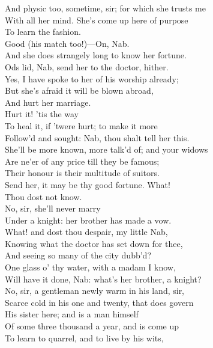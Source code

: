 \documentclass[a4paper,oneside]{memoir}
\begin{document}
\begin{drama*}
\druggerspeaks And physic too, sometime, sir; for which she trusts me\\
With all her mind. She's come up here of purpose\\
To learn the fashion.\\
\facespeaks {} Good (his match too!)---On, Nab.\\
\druggerspeaks And she does strangely long to know her fortune.\\
\facespeaks Ods lid, Nab, send her to the doctor, hither.\\
\druggerspeaks Yes, I have spoke to her of his worship already;\\
But she's afraid it will be blown abroad,\\
And hurt her marriage.\\
\facespeaks {} Hurt it! 'tis the way\\
To heal it, if 'twere hurt; to make it more\\
Follow'd and sought: Nab, thou shalt tell her this.\\
She'll be more known, more talk'd of; and your widows\\
Are ne'er of any price till they be famous;\\
Their honour is their multitude of suitors.\\
Send her, it may be thy good fortune. What!\\
Thou dost not know.\\
\druggerspeaks {} No, sir, she'll never marry\\
Under a knight: her brother has made a vow.\\
\facespeaks What! and dost thou despair, my little Nab,\\
Knowing what the doctor has set down for thee,\\
And seeing so many of the city dubb'd?\\
One glass o' thy water, with a madam I know,\\
Will have it done, Nab: what's her brother, a knight?\\
\druggerspeaks No, sir, a gentleman newly warm in his land, sir,\\
Scarce cold in his one and twenty, that does govern\\
His sister here; and is a man himself\\
Of some three thousand a year, and is come up\\
To learn to quarrel, and to live by his wits,\\

\end{drama*}
\end{document}
